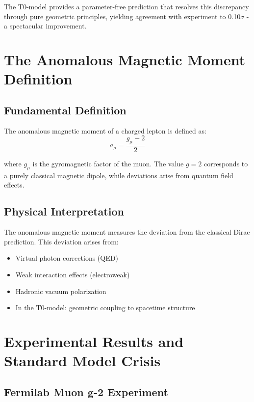 \documentclass[12pt,a4paper]{report}
\begin{document}
The T0-model provides a parameter-free prediction that resolves this discrepancy through pure geometric principles, yielding agreement with experiment to 0.10$\sigma$ - a spectacular improvement.

\section{The Anomalous Magnetic Moment Definition}
\label{sec:anomalous_moment_definition}

\subsection{Fundamental Definition}
\label{subsec:fundamental_definition}

The anomalous magnetic moment of a charged lepton is defined as:
\begin{equation}
	a_\mu = \frac{g_\mu - 2}{2}
	\label{eq:anomalous_moment_definition}
\end{equation}

where $g_\mu$ is the gyromagnetic factor of the muon. The value $g = 2$ corresponds to a purely classical magnetic dipole, while deviations arise from quantum field effects.

\subsection{Physical Interpretation}
\label{subsec:physical_interpretation}

The anomalous magnetic moment measures the deviation from the classical Dirac prediction. This deviation arises from:
\begin{itemize}
	\item Virtual photon corrections (QED)
	\item Weak interaction effects (electroweak)
	\item Hadronic vacuum polarization
	\item In the T0-model: geometric coupling to spacetime structure
\end{itemize}

\section{Experimental Results and Standard Model Crisis}
\label{sec:experimental_results}

\subsection{Fermilab Muon g-2 Experiment}
\label{subsec:fermilab_results}
\end{document}
